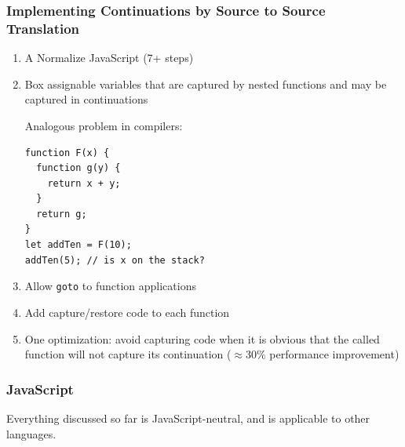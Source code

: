 \documentclass[8pt,pdf,handout]{beamer}
\begin{document}
\begin{frame}[fragile]
\frametitle{Implementing Continuations by Source to Source Translation}

\begin{enumerate}
  \item A Normalize JavaScript (7+ steps)
  \item Box assignable variables that are captured by nested functions and
  may be captured in continuations

  Analogous problem in compilers:
\begin{lstlisting}
function F(x) {
  function g(y) {
    return x + y;
  }
  return g;
}
let addTen = F(10);
addTen(5); // is x on the stack?
\end{lstlisting}

  \item Allow \lstinline|goto| to function applications
  \item Add capture/restore code to each function
  \item One optimization: avoid capturing code when it is obvious that
  the called function will not capture its continuation ($\approx30\%$ performance
  improvement)

\end{enumerate}

\end{frame}

\begin{frame}
\frametitle{JavaScript}

\begin{center}
Everything discussed so far is JavaScript-neutral, and is applicable
to other languages.
\end{center}

\end{frame}
\end{document}
